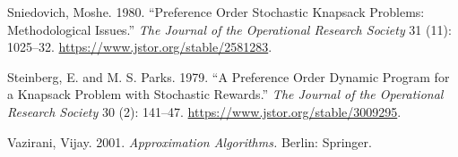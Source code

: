 \documentclass[11pt]{article} %
\theoremstyle{definition}
\theoremstyle{definition}
\begin{document}
Sniedovich, Moshe. 1980. ``Preference Order Stochastic Knapsack Problems: Methodological Issues.'' \emph{The Journal of the Operational Research Society} 31 (11): 1025--32. \url{https://www.jstor.org/stable/2581283}. 

Steinberg, E. and M. S. Parks. 1979. ``A Preference Order Dynamic Program for a Knapsack Problem with Stochastic Rewards.'' \emph{The Journal of the Operational Research Society} 30 (2): 141--47. \url{https://www.jstor.org/stable/3009295}. 

Vazirani, Vijay. 2001. \emph{Approximation Algorithms.} Berlin: Springer. 
\end{document}
